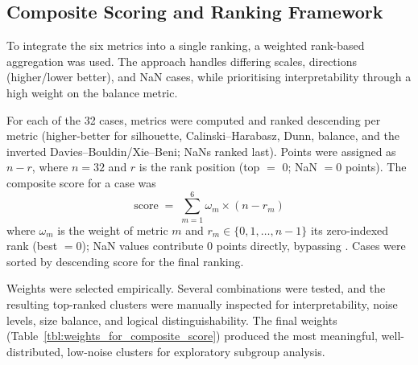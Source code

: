\subsection{Composite Scoring and Ranking Framework}

To integrate the six metrics into a single ranking, a weighted rank-based aggregation was used. The approach handles differing scales, directions (higher/lower better), and NaN cases, while prioritising interpretability through a high weight on the balance metric.

For each of the 32 cases, metrics were computed and ranked descending per metric (higher-better for silhouette, Calinski--Harabasz, Dunn, balance, and the inverted Davies--Bouldin/Xie--Beni; NaNs ranked last). Points were assigned as $n - r$, where $n = 32$ and $r$ is the rank position (top $=$ 0; NaN $= 0$ points). The composite score for a case was
\begin{equation}\label{eq:composite_score}
\text{score} \;=\; \sum_{m=1}^{6} \omega_m \times (n - r_m)
\end{equation}
where $\omega_m$ is the weight of metric $m$ and $r_m \in \{0, 1, \ldots, n-1\}$ its zero-indexed rank (best $= 0$); NaN values contribute 0 points directly, bypassing . Cases were sorted by descending score for the final ranking.

Weights were selected empirically. Several combinations were tested, and the resulting top-ranked clusters were manually inspected for interpretability, noise levels, size balance, and logical distinguishability. The final weights (Table~\ref{tbl:weights_for_composite_score}) produced the most meaningful, well-distributed, low-noise clusters for exploratory subgroup analysis.

